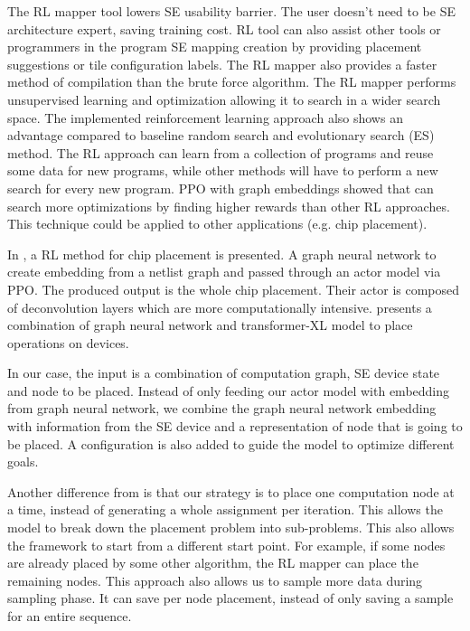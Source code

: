 The RL mapper tool lowers SE usability barrier. 
The user doesn’t need to be SE architecture expert, saving training cost. RL tool can also assist other tools or programmers in the program SE mapping creation by providing placement suggestions or tile configuration labels. 
The RL mapper also provides a faster method of compilation than the brute force algorithm. 
The RL mapper performs unsupervised learning and optimization allowing it to search in a wider search space. 
The implemented reinforcement learning approach also shows an advantage compared to baseline random search and evolutionary search (ES) method. 
The RL approach can learn from a collection of programs and reuse some data for new programs, while other methods will have to perform a new search for every new program. 
PPO with graph embeddings showed that can search more optimizations by finding higher rewards than other RL approaches. 
This technique could be applied to other applications (e.g. chip placement). 

In \cite{mirhoseini2020chip}, a RL method for chip placement is presented. 
A graph neural network to create embedding from a netlist graph and passed through an actor model via PPO. 
The produced output is the whole chip placement. 
Their actor is composed of deconvolution layers which are more computationally intensive. 
\cite{zhou2019gdp} presents a combination of graph neural network and transformer-XL model to place operations on devices. 

In our case, the input is a combination of computation graph, SE device state and node to be placed. 
Instead of only feeding our actor model with embedding from graph neural network, we combine the graph neural network embedding with information from the SE device and a representation of node that is going to be placed. 
A configuration is also added to guide the model to optimize different goals.  

Another difference from \cite{zhou2019gdp}  is that our strategy is to place one computation node at a time, instead of generating a whole assignment per iteration. 
This allows the model to break down the placement problem into sub-problems. 
This also allows the framework to start from a different start point. For example, if some nodes are already placed by some other algorithm, the RL mapper can place the remaining nodes. 
This approach also allows us to sample more data during sampling phase. 
It can save per node placement, instead of only saving a sample for an entire sequence.  
